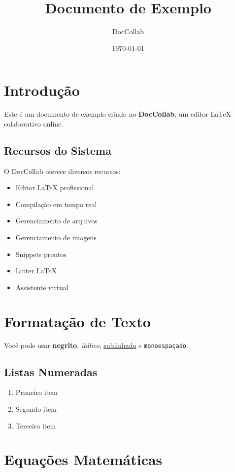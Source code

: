 \documentclass[12pt,a4paper]{article}
\title{Documento de Exemplo}
\author{DocCollab}
\date{\today}
\begin{document}
\maketitle

\section{Introdução}

Este é um documento de exemplo criado no \textbf{DocCollab}, um editor LaTeX colaborativo online.

\subsection{Recursos do Sistema}

O DocCollab oferece diversos recursos:

\begin{itemize}
  \item Editor LaTeX profissional
  \item Compilação em tempo real
  \item Gerenciamento de arquivos
  \item Gerenciamento de imagens
  \item Snippets prontos
  \item Linter LaTeX
  \item Assistente virtual
\end{itemize}

\section{Formatação de Texto}

Você pode usar \textbf{negrito}, \textit{itálico}, \underline{sublinhado} e \texttt{monoespaçado}.

\subsection{Listas Numeradas}

\begin{enumerate}
  \item Primeiro item
  \item Segundo item
  \item Terceiro item
\end{enumerate}

\section{Equações Matemáticas}
\end{document}
